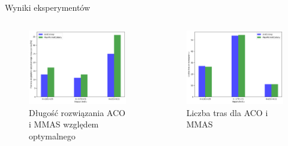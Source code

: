 \documentclass{beamer}
\begin{document}
\begin{frame}{Wyniki eksperymentów}
    \begin{columns}
        \begin{column}{0.55\textwidth}
            \begin{figure}
                \centering
                \includegraphics[width=\linewidth]{../report/img/maxmin_wzgledem_optymalnego.png}
                \caption{Długość rozwiązania ACO i MMAS względem optymalnego}
            \end{figure}        
        \end{column}
        \begin{column}{0.55\textwidth}
            \begin{figure}
                \centering
                \includegraphics[width=\linewidth]{../report/img/maxmin_trasy.png}
                \caption{Liczba tras dla ACO i MMAS}
            \end{figure}        
        \end{column}
    \end{columns}
\end{frame}
\end{document}
